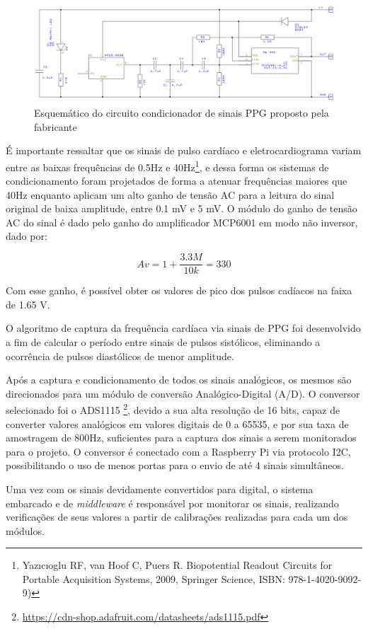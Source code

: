 \begin{figure}[h!]
    \begin{center}
        \includegraphics[scale=0.4]{figuras/ecg_sch.png}
    \end{center}
    \caption{Esquemático do circuito condicionador de sinais PPG proposto pela fabricante}
    \label{fig:ecg_sch}
\end{figure}

É importante ressaltar que os sinais de pulso cardíaco e eletrocardiograma variam 
entre as baixas frequências de 0.5Hz e 40Hz\footnote{ Yazıcıoglu RF, van Hoof C,
Puers R. Biopotential Readout Circuits for Portable Acquisition Systems, 2009,
Springer Science, ISBN: 978-1-4020-9092-9)}, e dessa forma os sistemas de 
condicionamento foram projetados de forma a atenuar frequências maiores que 40Hz 
enquanto aplicam um alto ganho de tensão AC para a leitura do sinal original de 
baixa amplitude, entre 0.1 mV e 5 mV. O módulo do ganho de tensão AC do sinal é dado pelo ganho do 
amplificador MCP6001 em modo não inversor, dado por:

\begin{equation}
  Av = 1 + \frac{3.3M}{10k} = 330
\end{equation}

Com esse ganho, é possível obter os valores de pico dos pulsos cadíacos na faixa 
de 1.65 V.

O algoritmo de captura da frequência cardíaca via sinais de PPG foi desenvolvido 
a fim de calcular o período entre sinais de pulsos sistólicos, eliminando a 
ocorrência de pulsos diastólicos de menor amplitude.

Após a captura e condicionamento de todos os sinais analógicos, os mesmos são direcionados
para um módulo de conversão Analógico-Digital (A/D). O conversor selecionado foi o ADS1115 \footnote{\url{https://cdn-shop.adafruit.com/datasheets/ads1115.pdf}},
devido a sua alta resolução de 16 bits, capaz de converter valores analógicos em valores
digitais de 0 a 65535, e por sua taxa de amostragem de 800Hz, suficientes para a captura dos
sinais a serem monitorados para o projeto. O conversor é conectado com a Raspberry Pi via protocolo I2C,
possibilitando o uso de menos portas para o envio de até 4 sinais simultâneos.

Uma vez com os sinais devidamente convertidos para digital, o sistema embarcado e de \textit{middleware}
é responsável por monitorar os sinais, realizando verificações de seus valores a partir de calibrações
realizadas para cada um dos módulos.
